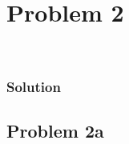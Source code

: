 \documentclass[conf]{new-aiaa}
\begin{document}
\section*{Problem 2} 

\begin{center}
	 \\
\end{center}


\subsubsection*{Solution} 





\subsection*{Problem 2a} 

\begin{center}
	 \\
\end{center}
\end{document}
